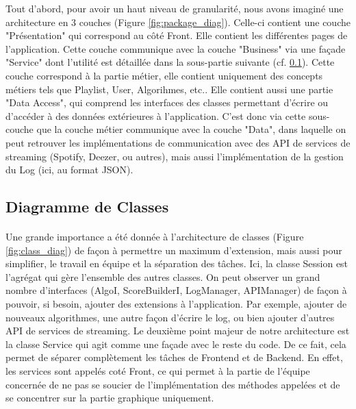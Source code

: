 \documentclass{article}
\begin{document}
		Tout d'abord, pour avoir un haut niveau de granularité, nous avons imaginé une architecture en 3 couches (Figure \ref{fig:package_diag}). Celle-ci contient une couche "Présentation" qui correspond au côté Front. Elle contient les différentes pages de l'application. Cette couche communique avec la couche "Business" via une façade "Service" dont l'utilité est détaillée dans la sous-partie suivante (cf. \ref{class_diag}). Cette couche correspond à la partie métier, elle contient uniquement des concepts métiers tels que Playlist, User, Algorihmes, etc.. Elle contient aussi une partie "Data Access", qui comprend les interfaces des classes permettant d'écrire ou d'accéder à des données extérieures à l'application. C'est donc via cette sous-couche que la couche métier communique avec la couche "Data", dans laquelle on peut retrouver les implémentations de communication avec des API de services de streaming (Spotify, Deezer, ou autres), mais aussi l'implémentation de la gestion du Log (ici, au format JSON).
		\subsection{Diagramme de Classes}\label{class_diag}
		\paragraph{}
		Une grande importance a été donnée à l'architecture de classes (Figure \ref{fig:class_diag}) de façon à permettre un maximum d'extension, mais aussi pour simplifier, le travail en équipe et la séparation des tâches. Ici, la classe Session est l'agrégat qui gère l'ensemble des autres classes. On peut observer un grand nombre d'interfaces (AlgoI, ScoreBuilderI, LogManager, APIManager) de façon à pouvoir, si besoin, ajouter des extensions à l'application. Par exemple, ajouter de nouveaux algorithmes, une autre façon d'écrire le log, ou  bien ajouter d'autres API de services de streaming. Le deuxième point majeur de notre architecture est la classe Service qui agit comme une façade avec le reste du code. De ce fait, cela permet de séparer complètement les tâches de Frontend et de Backend. En effet, les services sont appelés coté Front, ce qui permet à la partie de l'équipe concernée de ne pas se soucier de l'implémentation des méthodes appelées et de se concentrer sur la partie graphique uniquement.
		
\end{document}
